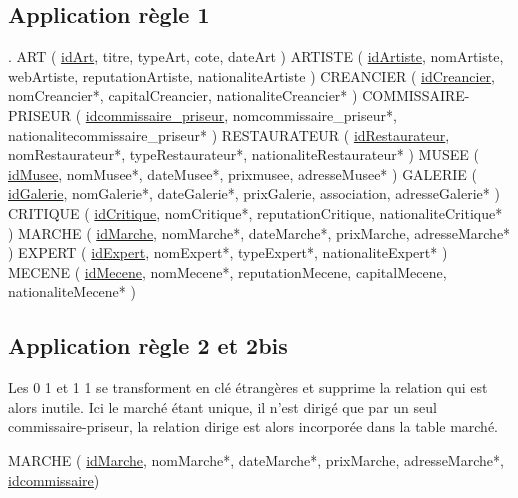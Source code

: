 \documentclass{article}
\begin{document}
\subsection{Application règle 1}
. \newline
ART ( \underline{idArt}, titre, typeArt, cote, dateArt ) \newline
ARTISTE ( \underline{idArtiste}, nomArtiste, webArtiste, reputationArtiste, nationaliteArtiste )\newline
CREANCIER ( \underline{idCreancier}, nomCreancier*, capitalCreancier, nationaliteCreancier* )\newline
COMMISSAIRE-PRISEUR ( \underline{idcommissaire\_priseur}, nomcommissaire\_priseur*, nationalitecommissaire\_priseur* )\newline
RESTAURATEUR ( \underline{idRestaurateur}, nomRestaurateur*, typeRestaurateur*, nationaliteRestaurateur* )\newline
MUSEE ( \underline{idMusee}, nomMusee*, dateMusee*, prixmusee, adresseMusee* )\newline
GALERIE ( \underline{idGalerie}, nomGalerie*, dateGalerie*, prixGalerie, association, adresseGalerie* )\newline
CRITIQUE ( \underline{idCritique}, nomCritique*, reputationCritique, nationaliteCritique* )\newline
MARCHE ( \underline{idMarche}, nomMarche*, dateMarche*, prixMarche, adresseMarche* )\newline
EXPERT ( \underline{idExpert}, nomExpert*, typeExpert*, nationaliteExpert* )\newline
MECENE ( \underline{idMecene}, nomMecene*, reputationMecene, capitalMecene, nationaliteMecene* )\newline



\subsection{Application règle 2 et 2bis}

Les 0 1 et 1 1 se transforment en clé étrangères et supprime la relation qui est alors inutile.
Ici le marché étant unique, il n'est dirigé que par un seul commissaire-priseur, la relation dirige est alors incorporée dans la table marché.

MARCHE ( \underline{idMarche}, nomMarche*, dateMarche*, prixMarche, adresseMarche*, \underline{\underline{idcommissaire}})
\end{document}

